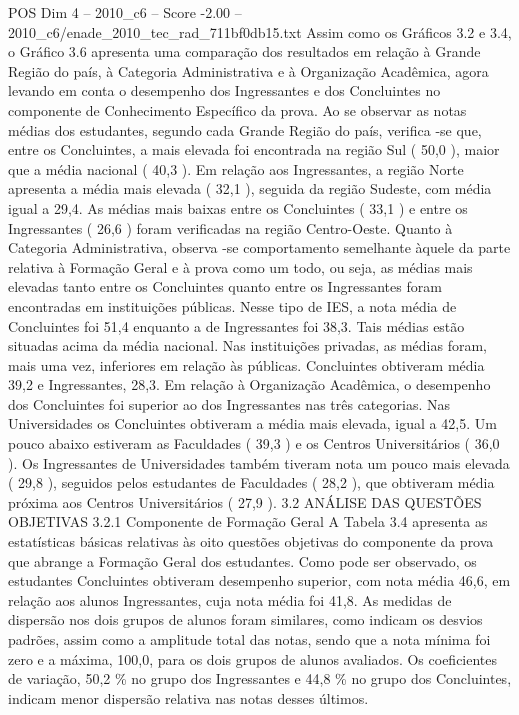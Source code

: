 \begin{textsample}{POS Dim 4 – 2010\_c6 – Score -2.00 – 2010\_c6/enade\_2010\_tec\_rad\_711bf0db15.txt}
Assim como os Gráficos 3.2 e 3.4, o Gráfico 3.6 apresenta uma comparação dos resultados em relação à Grande Região do país, à Categoria Administrativa e à Organização Acadêmica, agora levando em conta o desempenho dos Ingressantes e dos Concluintes no componente de Conhecimento Específico da prova.
Ao se observar as notas médias dos estudantes, segundo cada Grande Região do país, verifica -se que, entre os Concluintes, a mais elevada foi encontrada na região Sul ( 50,0 ), maior que a média nacional ( 40,3 ).
Em relação aos Ingressantes, a região Norte apresenta a média mais elevada ( 32,1 ), seguida da região Sudeste, com média igual a 29,4.
As médias mais baixas entre os Concluintes ( 33,1 ) e entre os Ingressantes ( 26,6 ) foram verificadas na região Centro-Oeste.
Quanto à Categoria Administrativa, observa -se comportamento semelhante àquele da parte relativa à Formação Geral e à prova como um todo, ou seja, as médias mais elevadas tanto entre os Concluintes quanto entre os Ingressantes foram encontradas em instituições públicas.
Nesse tipo de IES, a nota média de Concluintes foi 51,4 enquanto a de Ingressantes foi 38,3.
Tais médias estão situadas acima da média nacional.
Nas instituições privadas, as médias foram, mais uma vez, inferiores em relação às públicas.
Concluintes obtiveram média 39,2 e Ingressantes, 28,3.
Em relação à Organização Acadêmica, o desempenho dos Concluintes foi superior ao dos Ingressantes nas três categorias.
Nas Universidades os Concluintes obtiveram a média mais elevada, igual a 42,5.
Um pouco abaixo estiveram as Faculdades ( 39,3 ) e os Centros Universitários ( 36,0 ).
Os Ingressantes de Universidades também tiveram nota um pouco mais elevada ( 29,8 ), seguidos pelos estudantes de Faculdades ( 28,2 ), que obtiveram média próxima aos Centros Universitários ( 27,9 ). 3.2 ANÁLISE DAS QUESTÕES OBJETIVAS 3.2.1 Componente de Formação Geral A Tabela 3.4 apresenta as estatísticas básicas relativas às oito questões objetivas do componente da prova que abrange a Formação Geral dos estudantes.
Como pode ser observado, os estudantes Concluintes obtiveram desempenho superior, com nota média 46,6, em relação aos alunos Ingressantes, cuja nota média foi 41,8.
As medidas de dispersão nos dois grupos de alunos foram similares, como indicam os desvios padrões, assim como a amplitude total das notas, sendo que a nota mínima foi zero e a máxima, 100,0, para os dois grupos de alunos avaliados.
Os coeficientes de variação, 50,2 \% no grupo dos Ingressantes e 44,8 \% no grupo dos Concluintes, indicam menor dispersão relativa nas notas desses últimos.

\end{textsample}
